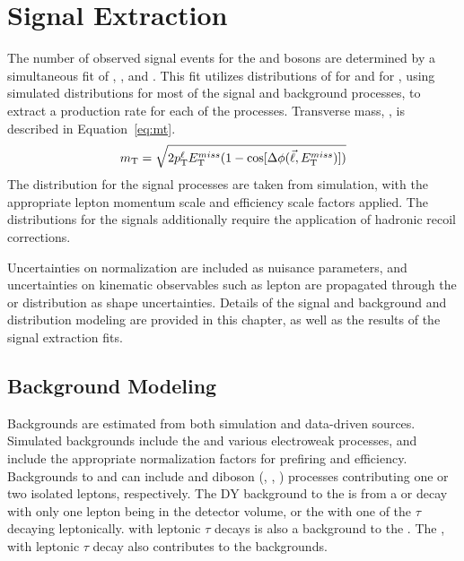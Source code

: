 \chapter{Signal Extraction}\label{ch:sig}
The number of observed signal events for the \Wpm and \Z bosons are determined by a simultaneous fit of \Wp, \Wm, and \Z. This fit utilizes distributions of \mt for \Wpm and \mll for \Z, using simulated distributions for most of the signal and background processes, to extract a production rate for each of the processes. Transverse mass, \mt, is described in Equation~\ref{eq:mt}.
\begin{equation}
m_{\mathrm{T}} = \sqrt{ 2 p_{\mathrm{T}}^{\ell} E_{\mathrm{T}}^{miss} ( 1 - \cos[\Delta\phi( {\vec \ell},E_{\mathrm{T}}^{miss} ) ] ) }
\label{eq:mt}
\end{equation}
The \mll distribution for the \zll signal processes are taken from simulation, with the appropriate lepton momentum scale and efficiency scale factors applied. The \mt distributions for the \wlnu signals additionally require the application of hadronic recoil corrections.

Uncertainties on normalization are included as nuisance parameters, and uncertainties on kinematic observables such as lepton \pt are propagated through the \mt or \mll distribution as shape uncertainties. Details of the signal and background \mt and \mll distribution modeling are provided in this chapter, as well as the results of the signal extraction fits.

\section{Background Modeling}\label{ch:sig:bkg}
Backgrounds are estimated from both simulation and data-driven sources. Simulated backgrounds include the \ttbar and various electroweak processes, and include the appropriate normalization factors for prefiring and efficiency. Backgrounds to \W and \Z can include \ttbar and diboson (\W\W, \W\Z, \Z\Z) processes contributing one or two isolated leptons, respectively. The DY background to the \W is from a \zmm or \zee decay with only one lepton being in the detector volume, or the \ztt with one of the $\tau$ decaying leptonically. \ztt with leptonic $\tau$ decays is also a background to the \Z. The \wtaunu, with leptonic $\tau$ decay also contributes to the \W backgrounds.

 
